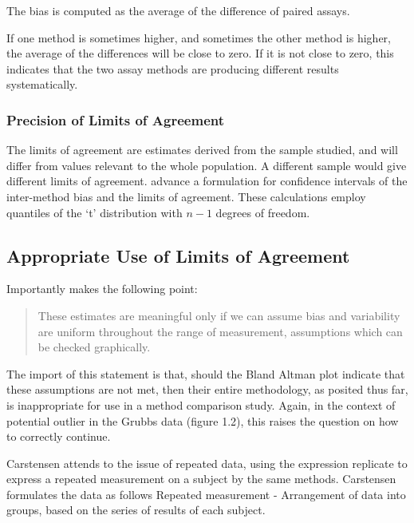 \documentclass[Main.tex]{subfiles}
\begin{document}
	The bias is computed as the average of the difference of paired
	assays.
	
	If one method is sometimes higher, and sometimes the other method
	is higher, the average of the differences will be close to zero.
	If it is not close to zero, this indicates that the two assay
	methods are producing different results systematically.
	
	\subsubsection{Precision of Limits of Agreement}
	The limits of agreement are estimates derived from the sample
	studied, and will differ from values relevant to the whole
	population. A different sample would give different limits of
	agreement. \citet*{BA86} advance a formulation for confidence
	intervals of the inter-method bias and the limits of agreement.
	These calculations employ quantiles of the `t' distribution with
	$n -1$ degrees of freedom.
	
	\subsection{Appropriate Use of Limits of Agreement}
	Importantly \citet{BA99} makes the following point:
	\begin{quote}These estimates are meaningful only if we can assume
		bias and variability are uniform throughout the range of
		measurement, assumptions which can be checked graphically.
	\end{quote}
	
	The import of this statement is that, should the Bland Altman
	plot indicate that these assumptions are not met, then their
	entire methodology, as posited thus far, is inappropriate for use
	in a method comparison study. Again, in the context of potential
	outlier in the Grubbs data (figure 1.2), this raises the question
	on how to correctly continue.
	
	Carstensen attends to the issue of repeated data, using the
	expression replicate to express a repeated measurement on a
	subject by the same methods. Carstensen formulates the data as
	follows Repeated measurement - Arrangement of data into groups,
	based on the series of results of each subject.
	
\end{document}
